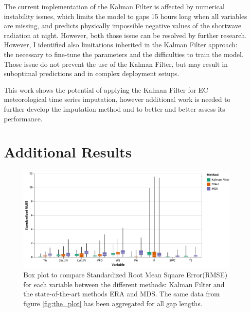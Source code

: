 \documentclass{article}
\newcommand{\imgwidth}{6in}
\let\Oldsection\section
\renewcommand{\section}{\FloatBarrier\Oldsection}
\let\Oldsubsection\subsection
\renewcommand{\subsection}{\FloatBarrier\Oldsubsection}
\begin{document}
The current implementation of the Kalman Filter is affected by numerical instability issues, which limits the model to gaps 15 hours long when all variables are missing, and predicts physically impossible negative values of the shortwave radiation at night. However, both those issue can be resolved by further research. However, I identified also limitations inherited in the Kalman Filter approach: the necessary to fine-tune the parameters and the difficulties to train the model. Those issue do not prevent the use of the Kalman Filter, but may result in suboptimal predictions and in complex deployment setups.

This work shows the potential of applying the Kalman Filter for EC meteorological time series imputation, however additional work is needed to further develop the imputation method and to better and better assess its performance. 

\printbibliography

\pagebreak

\appendix

\renewcommand\thefigure{\thesection.\arabic{figure}} 
\renewcommand\thetable{\thesection.\arabic{table}} 
\renewcommand\theequation{\thesection.\arabic{equation}} 

\FloatBarrier

\section{Additional Results}

\setcounter{figure}{0} 
\setcounter{table}{0} 


\begin{figure}[H]
    \centerline{\includegraphics[width=\imgwidth]{the_plot_stand}}
\caption{Box plot to compare Standardized Root Mean Square Error(RMSE) for each variable between the different methods: Kalman Filter and the state-of-the-art methods ERA and MDS. The same data from figure \ref{fig:the_plot} has been aggregated for all gap lengths.}
\label{fig:the_plot_stand}
\end{figure}
\end{document}
